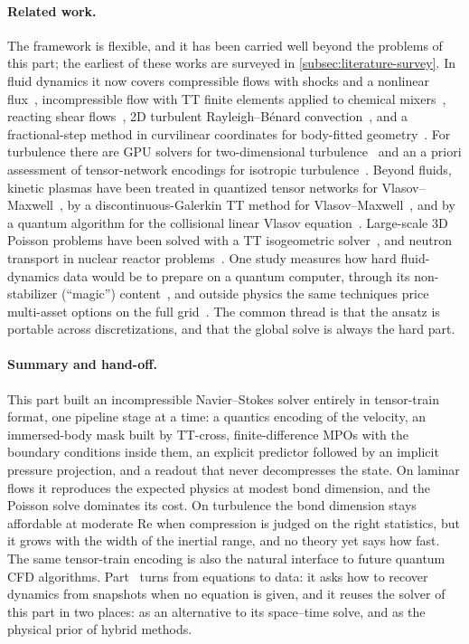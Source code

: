 \paragraph{Related work.}
The framework is flexible, and it has been carried well beyond the problems of
this part; the earliest of these works are surveyed in
\cref{subsec:literature-survey}. In fluid dynamics it now covers compressible
flows with shocks and a nonlinear flux~\cite{Peddinti2025}, incompressible flow
with TT finite elements applied to chemical mixers~\cite{Kornev2023}, reacting
shear flows~\cite{Pinkston2025}, 2D turbulent Rayleigh--B\'enard
convection~\cite{Huelst2026}, and a fractional-step method in curvilinear
coordinates for body-fitted geometry~\cite{Huelst2025}. For turbulence there are
GPU solvers for two-dimensional turbulence~\cite{Hoelscher2025} and an a priori
assessment of tensor-network encodings for isotropic
turbulence~\cite{Esmaeili2026}. Beyond fluids, kinetic plasmas have been treated
in quantized tensor networks for Vlasov--Maxwell~\cite{Ye2024}, by a
discontinuous-Galerkin TT method for Vlasov--Maxwell~\cite{Chinomona2026}, and
by a quantum algorithm for the collisional linear Vlasov
equation~\cite{Ameri2023}. Large-scale 3D Poisson problems have been solved with
a TT isogeometric solver~\cite{Tran2026}, and neutron transport in nuclear
reactor problems~\cite{Ortega2026}. One study measures how hard
fluid-dynamics data would be to prepare on a quantum computer, through its
non-stabilizer (\enquote{magic}) content~\cite{Mello2025}, and outside physics
the same techniques price multi-asset options on the full
grid~\cite{Arenstein2025a}. The common thread is that the ansatz is portable
across discretizations, and that the global solve is always the hard part.

\paragraph{Summary and hand-off.}
This part built an incompressible Navier--Stokes solver entirely in tensor-train
format, one pipeline stage at a time: a quantics encoding of the velocity, an
immersed-body mask built by TT-cross, finite-difference MPOs with the boundary
conditions inside them, an explicit predictor followed by an implicit pressure
projection, and a readout that never decompresses the state. On laminar flows
it reproduces the expected physics at modest bond dimension, and the Poisson
solve dominates its cost. On turbulence the bond dimension stays affordable at
moderate $\mathrm{Re}$ when compression is judged on the right statistics, but it
grows with the width of the inertial range, and no theory yet says how fast.
The same tensor-train encoding is also the natural interface to future quantum
CFD algorithms. Part~ turns from equations to data: it asks how to
recover dynamics from snapshots when no equation is given, and it reuses the
solver of this part in two places: as an alternative to its space--time solve,
and as the physical prior of hybrid methods.

